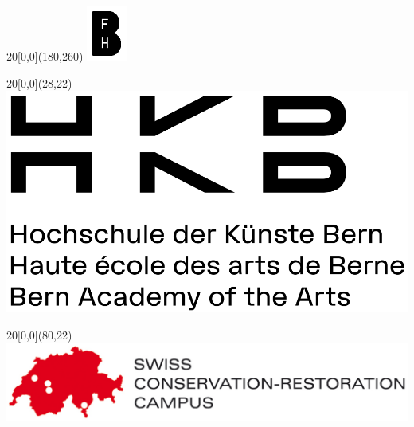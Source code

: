 
\begin{titlepage}


\setlength{\unitlength}{1mm}
\begin{textblock}{20}[0,0](180,260)
	\includegraphics[scale=0.7]{bilder/BFH_Logo.png}
\end{textblock}

\setlength{\unitlength}{1mm}
\begin{textblock}{20}[0,0](28,22)
	\includegraphics[scale=0.25]{bilder/HKB_Logo.png}
\end{textblock}

\setlength{\unitlength}{1mm}
\begin{textblock}{20}[0,0](80,22)
	\includegraphics[scale=0.65]{bilder/Swiss_Conservation_Campus.jpg}
\end{textblock}



\end{titlepage}

